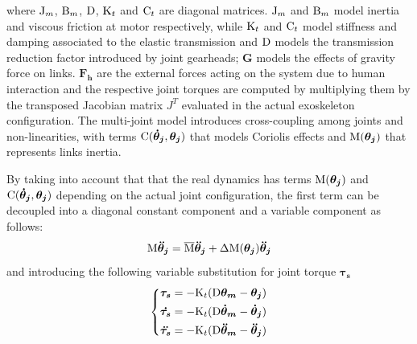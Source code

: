 \documentclass[journal]{IEEEtran}
\newcommand{\vectm}[1]{ { {\text #1} }}
\newcommand{\vects}[1]{{\boldsymbol {#1}}}
\begin{document}
where $\vectm{J_m}$, $\vectm{B_m}$, $\vectm{D}$, $\vectm{K_t}$ and $\vectm{C_t}$ are diagonal matrices.  $\vectm{J_m}$ and $\vectm{B_m}$ model inertia and viscous friction at motor respectively, while $\vectm{K_t}$ and $\vectm{C_t}$ model stiffness and damping associated to the elastic transmission and $\vectm{D}$ models  the transmission reduction factor introduced by joint gearheads; $\vects{G}$ models the effects of gravity force on links.
$\vects{F_h}$ are the external  forces  acting on the system  due to human interaction  and the respective joint torques are computed by multiplying them by the transposed Jacobian matrix  $J^T$ evaluated in the actual exoskeleton configuration. The multi-joint model introduces cross-coupling among joints and non-linearities, with terms $ \vectm{C}( \vects{\dot{\theta}_j}, \vects{\theta_j})  $ that models Coriolis effects and $\vectm{M}(\vects{\theta_j}) $ that represents links inertia.

By taking into account that
that the real dynamics has terms  $\vectm{M}(\vects{\theta_j}) $  and $ \vectm{C}( \vects{\dot{\theta}_j}, \vects{\theta_j}) $ depending on the actual joint configuration, the first term can be decoupled into a diagonal constant component and a variable component as follows:
\begin{equation}
\vectm{M }  \vects{\ddot{\theta}_j}=
\overline{\vectm{M} } \vects{\ddot{\theta}_j} + \Delta \vectm{M} (\vects{\theta_j}) \vects{\ddot{\theta}_j} 
\label{eq:InertialComponent}
\end{equation}
and introducing  the following variable substitution for joint torque $\vects{\tau_s}$
\footnotesize
\begin{equation}
\left \{
\begin{aligned}
\vects{\tau_s} & = - \vectm{K_t}  ( \vectm{D} \vects{\theta_m}- \vects{\theta_j} ) \\
\vects{\dot{\tau_s}} & = - \vectm{K_t}  ( \vectm{D}  \vects{\dot{\theta}_m} - \vects{\dot{\theta}_j} ) \\
\vects{\ddot{\tau_s}} & = - \vectm{K_t}  ( \vectm{D}  \vects{\ddot{\theta}_m} - \vects{\ddot{\theta}_j} ) \\
\end{aligned}
\right .
\label{eq:taus}
\end{equation}
\normalsize
\end{document}
